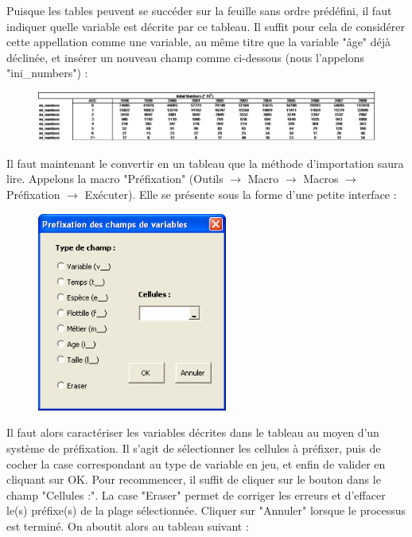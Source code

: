 \documentclass[12pt, colorinlistoftodos]{article}
\newenvironment{not used}[1]{%
    \longtable{%
        |>{\centering$\displaystyle}A{#1}{1}<{$}%
        |}\hline\ignorespaces}{%
    \endlongtable\ignorespacesafterend}
\begin{document}
Puisque les tables peuvent se succéder sur la feuille sans ordre prédéfini, il faut indiquer quelle variable est décrite par ce tableau. Il suffit pour cela de considérer cette appellation comme une variable, au même titre que la variable "âge" déjà déclinée, et insérer un nouveau champ comme ci-dessous (nous l'appelons "ini\_numbers") :

\begin{figure}[h!]
    \begin{center}
    \includegraphics[width = \textwidth]{figures/param/stock2.png}
    \end{center}
    \label{fig:ini_num}
\end{figure}

Il faut maintenant le convertir en un tableau que la méthode d'importation saura lire. Appelons la macro "Préfixation" (Outils $ \to $ Macro $ \to $ Macros $ \to $ Préfixation $ \to $ Exécuter). Elle se présente sous la forme d'une petite interface :

\begin{figure}[H]
    \begin{center}
    \includegraphics[width = 6.24cm]{figures/param/stock3.png}
    \end{center}
    \label{fig:prefix}
\end{figure}

Il faut alors caractériser les variables décrites dans le tableau au moyen d'un système de préfixation. Il s'agit de sélectionner les cellules à préfixer, puis de cocher la case correspondant au type de variable en jeu, et enfin de valider en cliquant sur OK. Pour recommencer, il suffit de cliquer sur le bouton dans le champ "Cellules :". La case "Eraser" permet de corriger les erreurs et d'effacer le(s) préfixe(s) de la plage sélectionnée. Cliquer sur "Annuler" lorsque le processus est terminé. On aboutit alors au tableau suivant :
\end{document}
